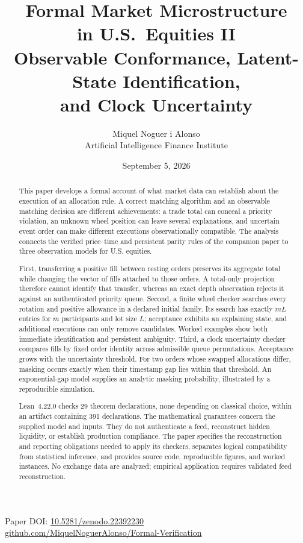 \documentclass[11pt]{article}
\title{Formal Market Microstructure\\
in U.S.\ Equities II\\[4pt]
\large Observable Conformance, Latent-State Identification,\\ and Clock Uncertainty}
\author{Miquel Noguer i Alonso\\ Artificial Intelligence Finance Institute}
\date{September 5, 2026}
\theoremstyle{definition}
\theoremstyle{remark}
\begin{document}
\maketitle
\begin{center}\small
Paper DOI: \href{https://doi.org/10.5281/zenodo.22392230}{10.5281/zenodo.22392230}\\[2pt]
\href{https://github.com/MiquelNoguerAlonso/Formal-Verification}{github.com/MiquelNoguerAlonso/Formal-Verification}
\end{center}

\begin{abstract}
This paper develops a formal account of what market data can establish about the execution of an allocation rule. A correct matching algorithm and an observable matching decision are different achievements: a trade total can conceal a priority violation, an unknown wheel position can leave several explanations, and uncertain event order can make different executions observationally compatible. The analysis connects the verified price--time and persistent parity rules of the companion paper to three observation models for U.S. equities.

First, transferring a positive fill between resting orders preserves its aggregate total while changing the vector of fills attached to those orders. A total-only projection therefore cannot identify that transfer, whereas an exact depth observation rejects it against an authenticated priority queue. Second, a finite wheel checker searches every rotation and positive allowance in a declared initial family. Its search has exactly $mL$ entries for $m$ participants and lot size $L$; acceptance exhibits an explaining state, and additional executions can only remove candidates. Worked examples show both immediate identification and persistent ambiguity. Third, a clock uncertainty checker compares fills by fixed order identity across admissible queue permutations. Acceptance grows with the uncertainty threshold. For two orders whose swapped allocations differ, masking occurs exactly when their timestamp gap lies within that threshold. An exponential-gap model supplies an analytic masking probability, illustrated by a reproducible simulation.

Lean~4.22.0 checks 29 theorem declarations, none depending on classical choice, within an artifact containing 391 declarations. The mathematical guarantees concern the supplied model and inputs. They do not authenticate a feed, reconstruct hidden liquidity, or establish production compliance. The paper specifies the reconstruction and reporting obligations needed to apply its checkers, separates logical compatibility from statistical inference, and provides source code, reproducible figures, and worked instances. No exchange data are analyzed; empirical application requires validated feed reconstruction.
\end{abstract}
\end{document}
